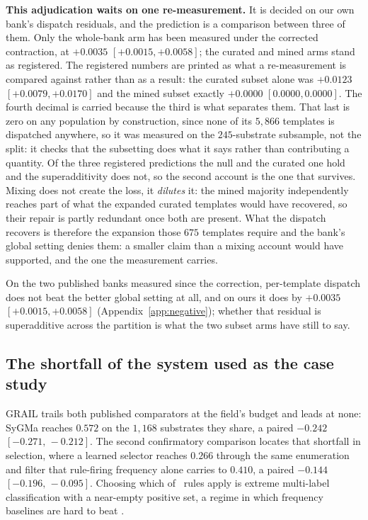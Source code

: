 \textbf{This adjudication waits on one re-measurement.} It is decided on our own bank's dispatch
residuals, and the prediction is a comparison between three of them. Only the whole-bank arm has
been measured under the corrected contraction, at $+0.0035$ $[+0.0015,+0.0058]$; the curated and
mined arms stand as registered. The registered numbers are printed as what a
re-measurement is compared against rather than as a result: the curated subset alone was $+0.0123$
$[+0.0079,+0.0170]$ and the mined subset exactly $+0.0000$ $[0.0000,0.0000]$. The fourth decimal is carried because the third is what separates them. That last is zero on any population by construction, since none of its $5{,}866$
templates is dispatched anywhere, so it was measured on the $245$-substrate subsample, not the split: it checks that the subsetting does what it says rather than contributing a quantity. Of
the three registered predictions the null and the curated one hold and the superadditivity does not,
so the second account is the one that survives. Mixing does not create the loss, it \emph{dilutes}
it: the mined majority independently reaches part of what the expanded curated templates would have
recovered, so their repair is partly redundant once both are present. What the dispatch recovers is
therefore the expansion those $675$ templates require and the bank's global setting denies them: a smaller claim than a mixing account would have supported, and the one the measurement carries.

On the two published banks measured since the correction, per-template dispatch does not beat the
better global setting at all, and on ours it does by $+0.0035$ $[+0.0015,+0.0058]$
(Appendix~\ref{app:negative}); whether that residual is superadditive across the partition is what
the two subset arms have still to say.

\subsection{The shortfall of the system used as the case study}

GRAIL trails both published comparators at the
field's budget and leads at none: SyGMa reaches $0.572$ on the $1{,}168$ substrates they share, a
paired $-0.242$ $[-0.271,\,-0.212]$. The second confirmatory comparison locates that shortfall in
selection, where a learned selector reaches $0.266$ through the same enumeration and filter that
rule-firing frequency alone carries to $0.410$, a paired $-0.144$ $[-0.196,\,-0.095]$. Choosing
which of \nbank\ rules apply is extreme multi-label classification with a near-empty positive set,
a regime in which frequency baselines are hard to beat \citep{Jain_2016}.
\label{sec:xmc}

